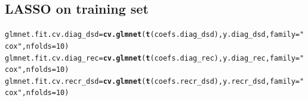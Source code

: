 \documentclass{article}\usepackage[]{graphicx}\usepackage[]{color}
\makeatletter
\newcommand{\hlnum}[1]{\textcolor[rgb]{0.686,0.059,0.569}{#1}}%
\newcommand{\hlstr}[1]{\textcolor[rgb]{0.192,0.494,0.8}{#1}}%
\newcommand{\hlstd}[1]{\textcolor[rgb]{0.345,0.345,0.345}{#1}}%
\newcommand{\hlkwb}[1]{\textcolor[rgb]{0.69,0.353,0.396}{#1}}%
\newcommand{\hlkwc}[1]{\textcolor[rgb]{0.333,0.667,0.333}{#1}}%
\newcommand{\hlkwd}[1]{\textcolor[rgb]{0.737,0.353,0.396}{\textbf{#1}}}%
\newenvironment{kframe}{%
 \def\at@end@of@kframe{}%
 \ifinner\ifhmode%
  \def\at@end@of@kframe{\end{minipage}}%
  \begin{minipage}{\columnwidth}%
 \fi\fi%
 \def\FrameCommand##1{\hskip\@totalleftmargin \hskip-\fboxsep
 \colorbox{shadecolor}{##1}\hskip-\fboxsep
     \hskip-\linewidth \hskip-\@totalleftmargin \hskip\columnwidth}%
 \MakeFramed {\advance\hsize-\width
   \@totalleftmargin\z@ \linewidth\hsize
   \@setminipage}}%
 {\par\unskip\endMakeFramed%
 \at@end@of@kframe}
\newenvironment{knitrout}{}{} %
\makeatother
\begin{document}
\subsection{LASSO on training set}
\begin{knitrout}
\color{fgcolor}\begin{kframe}
\begin{alltt}
\hlstd{glmnet.fit.cv.diag_dsd} \hlkwb{=} \hlkwd{cv.glmnet}\hlstd{(}\hlkwd{t}\hlstd{(coefs.diag_dsd), y.diag_dsd,} \hlkwc{family} \hlstd{=} \hlstr{"cox"}\hlstd{,} \hlkwc{nfolds} \hlstd{=} \hlnum{10}\hlstd{)}
\hlstd{glmnet.fit.cv.diag_rec} \hlkwb{=} \hlkwd{cv.glmnet}\hlstd{(}\hlkwd{t}\hlstd{(coefs.diag_rec), y.diag_rec,} \hlkwc{family} \hlstd{=} \hlstr{"cox"}\hlstd{,} \hlkwc{nfolds} \hlstd{=} \hlnum{10}\hlstd{)}
\hlstd{glmnet.fit.cv.recr_dsd} \hlkwb{=} \hlkwd{cv.glmnet}\hlstd{(}\hlkwd{t}\hlstd{(coefs.recr_dsd), y.recr_dsd,} \hlkwc{family} \hlstd{=} \hlstr{"cox"}\hlstd{,} \hlkwc{nfolds} \hlstd{=} \hlnum{10}\hlstd{)}
\end{alltt}
\end{kframe}
\end{knitrout}
\end{document}
